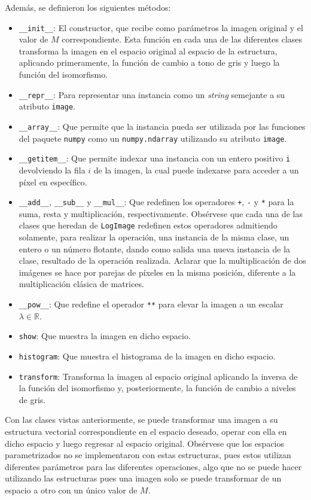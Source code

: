 Adem\'as, se definieron los siguientes m\'etodos:

\begin{itemize}
	\item \verb|__init__|: El constructor, que recibe como par\'ametros la imagen original y el valor de $M$ correspondiente. Esta funci\'on en cada una de las diferentes clases transforma la imagen en el espacio original al espacio de la estructura, aplicando primeramente, la funci\'on de cambio a tono de gris y luego la funci\'on del isomorfismo.
	\item \verb|__repr__|: Para representar una instancia como un \textit{string} semejante a su atributo \verb|image|.
	\item \verb|__array__|: Que permite que la instancia pueda ser utilizada por las funciones del paquete \verb|numpy| como un \verb|numpy.ndarray|  utilizando su atributo \verb|image|.
	\item \verb|__getitem__|: Que permite indexar una instancia con un entero positivo \verb|i| devolviendo la fila $i$ de la imagen, la cual puede indexarse para acceder a un p\'ixel en espec\'ifico.
	\item \verb|__add__|, \verb|__sub__| y \verb|__mul__|: Que redefinen los operadores \verb|+|, \verb|-| y \verb|*| para la suma, resta y multiplicaci\'on, respectivamente. Obs\'ervese que cada una de las clases que heredan de \verb|LogImage| redefinen estos operadores admitiendo solamente, para realizar la operaci\'on, una instancia de la misma clase, un entero o un n\'umero flotante, dando como salida una nueva instancia de la clase, resultado de la operaci\'on realizada. Aclarar que la multiplicaci\'on de dos im\'agenes se hace por parejas de p\'ixeles en la misma posici\'on, diferente a la multiplicaci\'on cl\'asica de matrices.
	\item \verb|__pow__|: Que redefine el operador \verb|**| para elevar la imagen a un escalar $\lambda\in \mathbb{R}$.
	\item \verb|show|: Que muestra la imagen en dicho espacio.
	\item \verb|histogram|: Que muestra el histograma de la imagen en dicho espacio.
	\item \verb|transform|: Transforma la imagen al espacio original aplicando la inversa de la funci\'on del isomorfismo y, posteriormente, la funci\'on de cambio a niveles de gris.
\end{itemize}

Con las clases vistas anteriormente, se puede transformar una imagen a su estructura vectorial correspondiente en el espacio deseado, operar con ella en dicho espacio y luego regresar al espacio original. Obs\'ervese que los espacios parametrizados no se implementaron con estas estructuras, pues estos utilizan diferentes par\'ametros para las diferentes operaciones, algo que no se puede hacer utilizando las estructuras pues una imagen solo se puede transformar de un espacio a otro con un \'unico valor de $M$.

